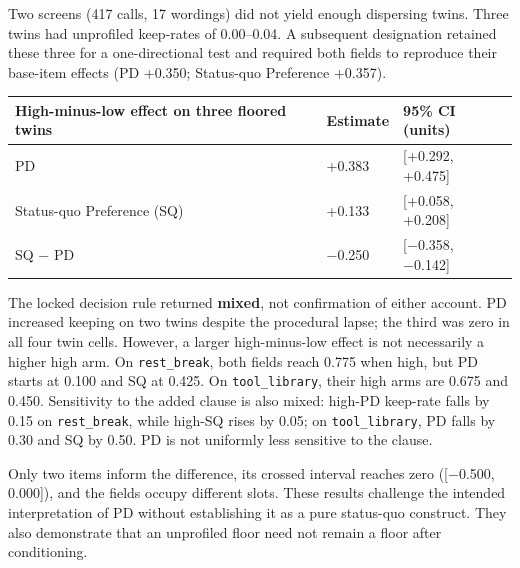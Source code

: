 \documentclass[
  11pt]{article}
\begin{document}
Two screens (417 calls, 17 wordings) did not yield enough dispersing
twins. Three twins had unprofiled keep-rates of 0.00--0.04. A subsequent
designation retained these three for a one-directional test and required
both fields to reproduce their base-item effects (PD +0.350; Status-quo
Preference +0.357).

\begin{longtable}[]{@{}
  >{\raggedright\arraybackslash}p{}
  >{\raggedleft\arraybackslash}p{}
  >{\raggedright\arraybackslash}p{}@{}}
\toprule\noalign{}
\begin{minipage}[b]{\linewidth}\raggedright
High-minus-low effect on three floored twins
\end{minipage} & \begin{minipage}[b]{\linewidth}\raggedleft
Estimate
\end{minipage} & \begin{minipage}[b]{\linewidth}\raggedright
95\% CI (units)
\end{minipage} \\
\midrule\noalign{}
\endhead
\bottomrule\noalign{}
\endlastfoot
PD & +0.383 & {[}+0.292, +0.475{]} \\
Status-quo Preference (SQ) & +0.133 & {[}+0.058, +0.208{]} \\
SQ − PD & −0.250 & {[}−0.358, −0.142{]} \\
\end{longtable}

The locked decision rule returned \textbf{mixed}, not confirmation of
either account. PD increased keeping on two twins despite the procedural
lapse; the third was zero in all four twin cells. However, a larger
high-minus-low effect is not necessarily a higher high arm. On
\texttt{rest\_break}, both fields reach 0.775 when high, but PD starts
at 0.100 and SQ at 0.425. On \texttt{tool\_library}, their high arms are
0.675 and 0.450. Sensitivity to the added clause is also mixed: high-PD
keep-rate falls by 0.15 on \texttt{rest\_break}, while high-SQ rises by
0.05; on \texttt{tool\_library}, PD falls by 0.30 and SQ by 0.50. PD is
not uniformly less sensitive to the clause.

Only two items inform the difference, its crossed interval reaches zero
({[}−0.500, 0.000{]}), and the fields occupy different slots. These
results challenge the intended interpretation of PD without establishing
it as a pure status-quo construct. They also demonstrate that an
unprofiled floor need not remain a floor after conditioning.
\end{document}
